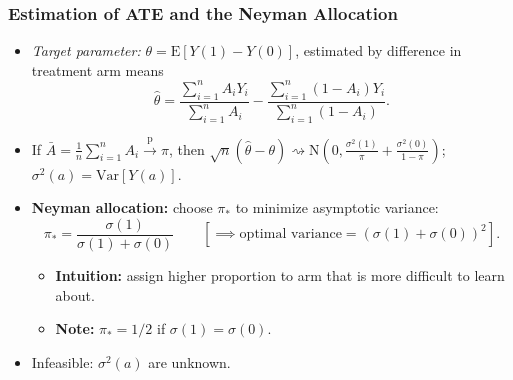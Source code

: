 \documentclass[aspectratio=169, 10pt]{beamer}
\theoremstyle{definition}
\theoremstyle{plain}
\def\E{\mathrm{E}}
\def\Var{\mathrm{Var}}
\def\pto{\overset{\mathrm{p}}{\to}}
\def\dto{\rightsquigarrow}
\def\Normal{\mathrm{N}} %
\begin{document}
\begin{frame}
\frametitle{Estimation of ATE and the Neyman Allocation}
\begin{itemize}
  \item \emph{Target parameter:} \(\theta = \E[Y(1) - Y(0)]\), estimated by
     difference in treatment arm means
    \begin{equation*}
      \hat{\theta} = \frac{\sum_{i = 1}^{n} A_{i} Y_{i}}{\sum_{i = 1}^{n} A_{i}}
      - \frac{\sum_{i = 1}^{n} (1 - A_{i}) Y_{i}}{\sum_{i = 1}^{n} (1 - A_{i})}.
    \end{equation*}
    \vfill
  \item If \(\bar{A} = \frac{1}{n} \sum_{i = 1}^{n} A_{i} \pto \pi\), then
    \(\sqrt{n} (\hat{\theta} - \theta) \dto \Normal \left( 0, \frac{\sigma^{2}
      (1)}{\pi} + \frac{\sigma^{2} (0)}{1 - \pi} \right)\); \(\sigma^{2} (a) =
    \Var [Y (a)]\).
    \vfill
  \item \textbf{Neyman allocation:} choose \(\pi_{\ast}\) to minimize asymptotic
    variance:
    \begin{equation*}
      \pi_{\ast} = \frac{\sigma (1)}{\sigma (1) + \sigma (0)}
      \qquad
      \left[
      \implies
      \text{optimal variance} = (\sigma (1) + \sigma (0))^{2} \right].
    \end{equation*}
    \vfill
    \begin{itemize}
      \item \textbf{Intuition:} assign higher proportion to arm that is more
        difficult to learn about.
        \vfill
      \item \textbf{Note:} \(\pi_{\ast} = 1/2\) if \(\sigma (1) = \sigma (0)\).
    \end{itemize}
    \vfill
  \item Infeasible: \(\sigma^{2} (a)\) are unknown.
\end{itemize}
\end{frame}
\end{document}
